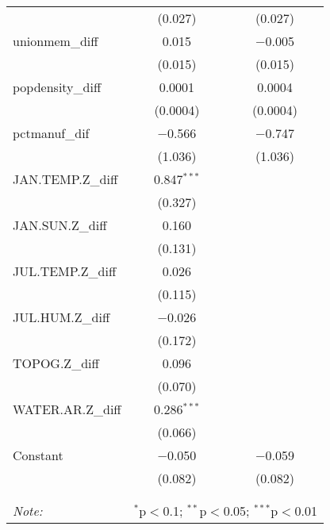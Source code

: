 \begin{table}[!htbp]
\begin{tabular}{@{\extracolsep{5pt}}lcc}
  & (0.027) & (0.027) \\ 
  unionmem\_diff & 0.015 & $-$0.005 \\ 
  & (0.015) & (0.015) \\ 
  popdensity\_diff & 0.0001 & 0.0004 \\ 
  & (0.0004) & (0.0004) \\ 
  pctmanuf\_dif & $-$0.566 & $-$0.747 \\ 
  & (1.036) & (1.036) \\ 
  JAN.TEMP.Z\_diff & 0.847$^{***}$ &  \\ 
  & (0.327) &  \\ 
  JAN.SUN.Z\_diff & 0.160 &  \\ 
  & (0.131) &  \\ 
  JUL.TEMP.Z\_diff & 0.026 &  \\ 
  & (0.115) &  \\ 
  JUL.HUM.Z\_diff & $-$0.026 &  \\ 
  & (0.172) &  \\ 
  TOPOG.Z\_diff & 0.096 &  \\ 
  & (0.070) &  \\ 
  WATER.AR.Z\_diff & 0.286$^{***}$ &  \\ 
  & (0.066) &  \\ 
  Constant & $-$0.050 & $-$0.059 \\ 
  & (0.082) & (0.082) \\ 
 \hline \\[-1.8ex] 
\hline 
\hline \\[-1.8ex] 
\textit{Note:}  & \multicolumn{2}{r}{$^{*}$p$<$0.1; $^{**}$p$<$0.05; $^{***}$p$<$0.01} \\ 
\end{tabular} 
\end{table} 
